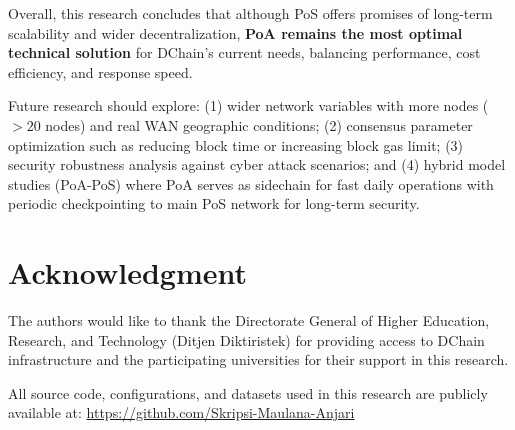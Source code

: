 \documentclass[conference]{IEEEtran}
\begin{document}
Overall, this research concludes that although PoS offers promises of long-term scalability and wider decentralization, \textbf{PoA remains the most optimal technical solution} for DChain's current needs, balancing performance, cost efficiency, and response speed.

Future research should explore: (1) wider network variables with more nodes ($>20$ nodes) and real WAN geographic conditions; (2) consensus parameter optimization such as reducing block time or increasing block gas limit; (3) security robustness analysis against cyber attack scenarios; and (4) hybrid model studies (PoA-PoS) where PoA serves as sidechain for fast daily operations with periodic checkpointing to main PoS network for long-term security.

\section*{Acknowledgment}

The authors would like to thank the Directorate General of Higher Education, Research, and Technology (Ditjen Diktiristek) for providing access to DChain infrastructure and the participating universities for their support in this research.

All source code, configurations, and datasets used in this research are publicly available at: \url{https://github.com/Skripsi-Maulana-Anjari}

{}

\end{document}
